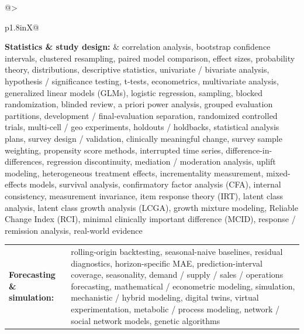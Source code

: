 \documentclass[letterpaper,11pt]{article}
\begin{document}
\begin{tabularx}{\linewidth}{@{}>{\raggedright\arraybackslash}p{1.8in}X@{}}
\textbf{Statistics \& study design:} & \footnotesize{correlation analysis, bootstrap confidence intervals, clustered resampling, paired model comparison, effect sizes, probability theory, distributions, descriptive statistics, univariate / bivariate analysis, hypothesis / significance testing, t-tests, econometrics, multivariate analysis, generalized linear models (GLMs), logistic regression, sampling, blocked randomization, blinded review, a priori power analysis, grouped evaluation partitions, development / final-evaluation separation, randomized controlled trials, multi-cell / geo experiments, holdouts / holdbacks, statistical analysis plans, survey design / validation, clinically meaningful change, survey sample weighting, propensity score methods, interrupted time series, difference-in-differences, regression discontinuity, mediation / moderation analysis, uplift modeling, heterogeneous treatment effects, incrementality measurement, mixed-effects models, survival analysis, confirmatory factor analysis (CFA), internal consistency, measurement invariance, item response theory (IRT), latent class analysis, latent class growth analysis (LCGA), growth mixture modeling, Reliable Change Index (RCI), minimal clinically important difference (MCID), response / remission analysis, real-world evidence}\\
\end{tabularx}
\par\vspace{2pt}
\begin{tabularx}{\linewidth}{@{}>{\raggedright\arraybackslash}p{1.8in}X@{}}
\textbf{Forecasting \& simulation:} & \footnotesize{rolling-origin backtesting, seasonal-naive baselines, residual diagnostics, horizon-specific MAE, prediction-interval coverage, seasonality, demand / supply / sales / operations forecasting, mathematical / econometric modeling, simulation, mechanistic / hybrid modeling, digital twins, virtual experimentation, metabolic / process modeling, network / social network models, genetic algorithms}\\
\end{tabularx}
\par\vspace{2pt}
\end{document}
